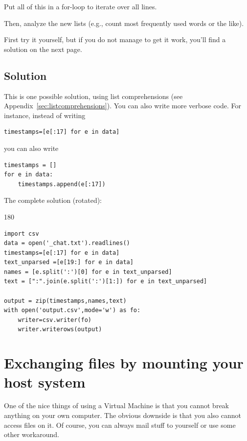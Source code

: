 \documentclass[a4paper,12pt]{book}
\begin{document}
\begin{appendices}
Put all of this in a for-loop to iterate over all lines.

Then, analyze the new lists (e.g., count most frequently used words or the like).

First try it yourself, but if you do not manage to get it work, you'll find a solution on the next page.

\newpage

\section{Solution}
This is one possible solution, using list comprehensions (see Appendix~\ref{sec:listcomprehensions}). You can also write more verbose code. For instance, instead of writing
\begin{lstlisting}
timestamps=[e[:17] for e in data]
\end{lstlisting}
you can also write
\begin{lstlisting}
timestamps = []
for e in data:
    timestamps.append(e[:17])
\end{lstlisting}

The complete solution (rotated):

\vspace{8cm}
\hspace{15cm}
\begin{rotate}{180}
\begin{lstlisting}
import csv
data = open('_chat.txt').readlines()
timestamps=[e[:17] for e in data]
text_unparsed =[e[19:] for e in data]
names = [e.split(':')[0] for e in text_unparsed]
text = [":".join(e.split(':')[1:]) for e in text_unparsed]

output = zip(timestamps,names,text)
with open('output.csv',mode='w') as fo:
    writer=csv.writer(fo)
    writer.writerows(output)
\end{lstlisting}
\end{rotate}





\chapter[Exchanging files]{Exchanging files by mounting your host system}

One of the nice things of using a Virtual Machine is that you cannot break anything on your own computer. The obvious downside is that you also cannot access files on it. Of course, you can always mail stuff to yourself or use some other workaround. 


\end{appendices}
\end{document}
